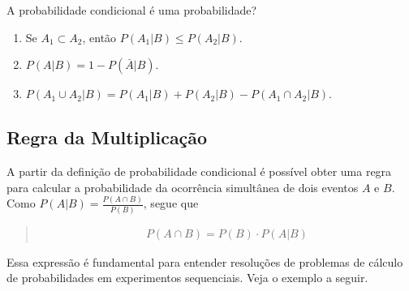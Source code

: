 \begin{example} {A probabilidade condicional é uma probabilidade?}
\begin{enumerate}
\item {} 
Se \(A_1\subset A_2\),  então \(P(A_1|B)\leq P(A_2|B)\).

\item {} 
\(P(A|B)=1-P(\bar{A}|B)\).

\item {} 
\(P(A_1 \cup A_2|B)=P(A_1|B)+P(A_2|B)-P(A_1\cap A_2|B)\).

\end{enumerate}
\end{example}


\subsection{Regra da Multiplicação}
\label{\detokenize{PE511-7:id2}}\label{\detokenize{PE511-7:regra-da-multiplicacao}}
A partir da definição de probabilidade condicional é possível obter uma regra para calcular a probabilidade da ocorrência simultânea de dois eventos \(A\)  e \(B\). Como \(P(A|B)=\frac{P(A\cap B)}{P(B)}\), segue que
\begin{quote}
\begin{equation*}
\begin{split}P(A\cap B)=P(B)\cdot P(A|B)\end{split}
\end{equation*}\end{quote}

Essa expressão é fundamental para entender resoluções de problemas de cálculo de probabilidades em experimentos sequenciais. Veja o exemplo a seguir.


